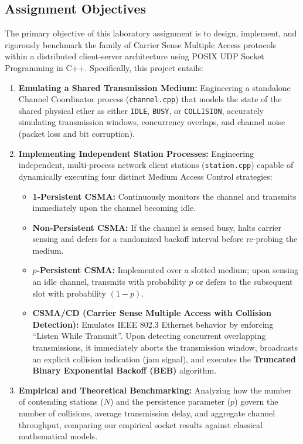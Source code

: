 \documentclass[12pt, a4paper]{article}
\begin{document}
\subsection{Assignment Objectives}
The primary objective of this laboratory assignment is to design, implement, and rigorously benchmark the family of Carrier Sense Multiple Access protocols within a distributed client-server architecture using POSIX UDP Socket Programming in C++. Specifically, this project entails:
\begin{enumerate}
    \item \textbf{Emulating a Shared Transmission Medium:} Engineering a standalone Channel Coordinator process (\texttt{channel.cpp}) that models the state of the shared physical ether as either \texttt{IDLE}, \texttt{BUSY}, or \texttt{COLLISION}, accurately simulating transmission windows, concurrency overlaps, and channel noise (packet loss and bit corruption).
    \item \textbf{Implementing Independent Station Processes:} Engineering independent, multi-process network client stations (\texttt{station.cpp}) capable of dynamically executing four distinct Medium Access Control strategies:
    \begin{itemize}
        \item \textbf{1-Persistent CSMA:} Continuously monitors the channel and transmits immediately upon the channel becoming idle.
        \item \textbf{Non-Persistent CSMA:} If the channel is sensed busy, halts carrier sensing and defers for a randomized backoff interval before re-probing the medium.
        \item \textbf{$p$-Persistent CSMA:} Implemented over a slotted medium; upon sensing an idle channel, transmits with probability $p$ or defers to the subsequent slot with probability $(1-p)$.
        \item \textbf{CSMA/CD (Carrier Sense Multiple Access with Collision Detection):} Emulates IEEE 802.3 Ethernet behavior by enforcing ``Listen While Transmit''. Upon detecting concurrent overlapping transmissions, it immediately aborts the transmission window, broadcasts an explicit collision indication (jam signal), and executes the \textbf{Truncated Binary Exponential Backoff (BEB)} algorithm.
    \end{itemize}
    \item \textbf{Empirical and Theoretical Benchmarking:} Analyzing how the number of contending stations ($N$) and the persistence parameter ($p$) govern the number of collisions, average transmission delay, and aggregate channel throughput, comparing our empirical socket results against classical mathematical models.
\end{enumerate}
\end{document}
